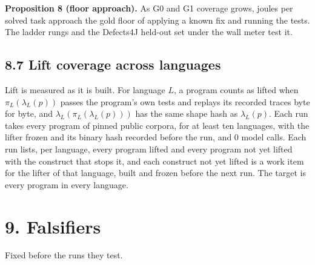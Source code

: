 \documentclass[10pt,letterpaper]{article}
\begin{document}
\textbf{Proposition 8 (floor approach).} As G0 and G1 coverage grows,
joules per solved task approach the gold floor of applying a known fix
and running the tests. The ladder rungs and the Defects4J held-out set
under the wall meter test it.

\subsection{8.7 Lift coverage across
languages}\label{lift-coverage-across-languages}

Lift is measured as it is built. For language \(L\), a program counts as
lifted when \(\pi_L(\lambda_L(p))\) passes the program's own tests and
replays its recorded traces byte for byte, and
\(\lambda_L(\pi_L(\lambda_L(p)))\) has the same shape hash as
\(\lambda_L(p)\). Each run takes every program of pinned public corpora,
for at least ten languages, with the lifter frozen and its binary hash
recorded before the run, and 0 model calls. Each run lists, per
language, every program lifted and every program not yet lifted with the
construct that stops it, and each construct not yet lifted is a work
item for the lifter of that language, built and frozen before the next
run. The target is every program in every language.

\section{9. Falsifiers}\label{falsifiers}

Fixed before the runs they test.
\end{document}
